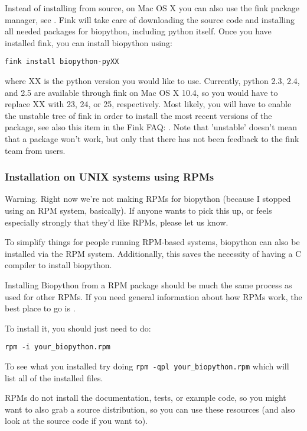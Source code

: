 \documentclass{article}
\begin{document}
Instead of installing from source, on Mac OS X you can also use the fink package manager, see . Fink will take care of downloading the source code and installing all needed packages for biopython, including python itself. Once you have installed fink, you can install biopython using:

\begin{verbatim}
fink install biopython-pyXX
\end{verbatim}

\noindent where XX is the python version you would like to use. Currently, python 2.3, 2.4, and 2.5 are available through fink on Mac OS X 10.4, so you would have to replace XX with 23, 24, or 25, respectively. Most likely, you will have to enable the unstable tree of fink in order to install the most recent versions of the package, see also this item in the Fink FAQ: . Note that 'unstable' doesn't mean that a package won't work, but only that there has not been feedback to the fink team from users.

\subsubsection{Installation on UNIX systems using RPMs}

Warning. Right now we're not making RPMs for biopython (because I
stopped using an RPM system, basically). If anyone wants to pick this
up, or feels especially strongly that they'd like RPMs, please let us
know.

To simplify things for people running RPM-based systems, biopython can
also be installed via the RPM system. Additionally, this saves the 
necessity of having a C compiler to install biopython. 


Installing Biopython from a RPM package should be much the same process as used for other RPMs. If you need general information about how RPMs work, the best place to go is .


To install it, you should just need to do:

\begin{verbatim}
rpm -i your_biopython.rpm
\end{verbatim}

To see what you installed try doing \verb|rpm -qpl your_biopython.rpm| which will list all of the installed files.


RPMs do not install the documentation, tests, or example code, so you might want to also grab a source distribution, so you can use these resources (and also look at the source code if you want to).
\end{document}
